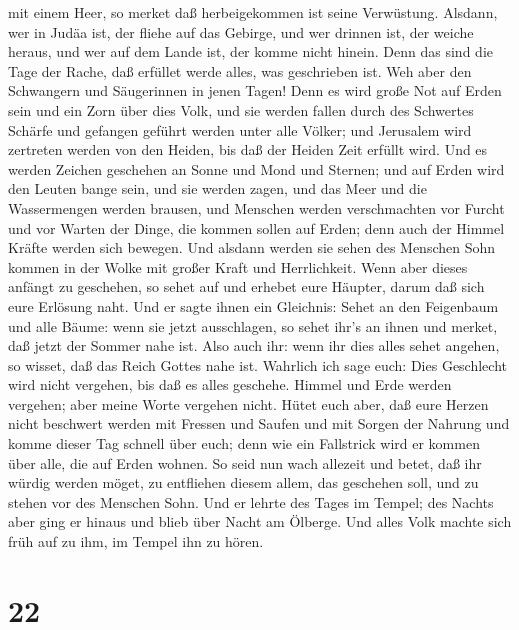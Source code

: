 mit einem Heer, so merket daß herbeigekommen ist seine Verwüstung.
 Alsdann, wer in Judäa ist, der fliehe auf das Gebirge, und
wer drinnen ist, der weiche heraus, und wer auf dem Lande ist, der komme
nicht hinein.  Denn das sind die Tage der Rache, daß
erfüllet werde alles, was geschrieben ist.  Weh aber den
Schwangern und Säugerinnen in jenen Tagen! Denn es wird große Not auf
Erden sein und ein Zorn über dies Volk,  und sie werden
fallen durch des Schwertes Schärfe und gefangen geführt werden unter
alle Völker; und Jerusalem wird zertreten werden von den Heiden, bis daß
der Heiden Zeit erfüllt wird.  Und es werden Zeichen
geschehen an Sonne und Mond und Sternen; und auf Erden wird den Leuten
bange sein, und sie werden zagen, und das Meer und die Wassermengen
werden brausen,  und Menschen werden verschmachten vor
Furcht und vor Warten der Dinge, die kommen sollen auf Erden; denn auch
der Himmel Kräfte werden sich bewegen.  Und alsdann werden
sie sehen des Menschen Sohn kommen in der Wolke mit großer Kraft und
Herrlichkeit.  Wenn aber dieses anfängt zu geschehen, so
sehet auf und erhebet eure Häupter, darum daß sich eure Erlösung naht.
 Und er sagte ihnen ein Gleichnis: Sehet an den Feigenbaum
und alle Bäume:  wenn sie jetzt ausschlagen, so sehet ihr's
an ihnen und merket, daß jetzt der Sommer nahe ist.  Also
auch ihr: wenn ihr dies alles sehet angehen, so wisset, daß das Reich
Gottes nahe ist.  Wahrlich ich sage euch: Dies Geschlecht
wird nicht vergehen, bis daß es alles geschehe.  Himmel und
Erde werden vergehen; aber meine Worte vergehen nicht. 
Hütet euch aber, daß eure Herzen nicht beschwert werden mit Fressen und
Saufen und mit Sorgen der Nahrung und komme dieser Tag schnell über
euch;  denn wie ein Fallstrick wird er kommen über alle,
die auf Erden wohnen.  So seid nun wach allezeit und betet,
daß ihr würdig werden möget, zu entfliehen diesem allem, das geschehen
soll, und zu stehen vor des Menschen Sohn.  Und er lehrte
des Tages im Tempel; des Nachts aber ging er hinaus und blieb über Nacht
am Ölberge.  Und alles Volk machte sich früh auf zu ihm, im
Tempel ihn zu hören.

\hypertarget{section-21}{%
\section{22}\label{section-21}}

